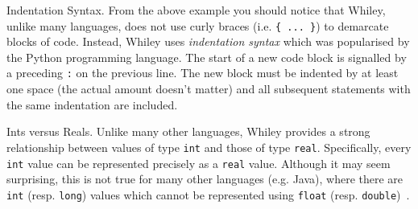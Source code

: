 \begin{insight}{Indentation Syntax.}
  From the above example you should notice that Whiley, unlike many
  languages, does not use curly braces (i.e. \verb+{ ... }+) to
  demarcate blocks of code.  Instead, Whiley uses {\em indentation
    syntax} which was popularised by the Python programming language.
  The start of a new code block is signalled by a preceding \verb+:+
  on the previous line.  The new block must be indented by at least
  one space (the actual amount doesn't matter) and all subsequent
  statements with the same indentation are included.
\end{insight}

\begin{insight}{Ints versus Reals.}
Unlike many other languages, Whiley provides a strong relationship
between values of type \lstinline{int} and those of type
\lstinline{real}.  Specifically, every \lstinline{int} value can be
represented precisely as a \lstinline{real} value.  Although it may
seem surprising, this is not true for many other languages
(e.g. Java), where there are \lstinline{int} (resp. \lstinline{long})
values which cannot be represented using \lstinline{float}
(resp. \lstinline{double})~\cite{GJSB05}.
\end{insight}


\newpage
